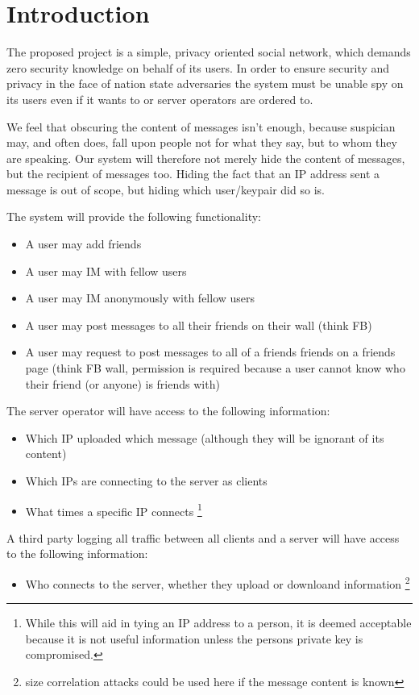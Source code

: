 \section{Introduction}
The proposed project is a simple, privacy oriented social network, which demands
zero security knowledge on behalf of its users. In order to ensure security and
privacy in the face of nation state adversaries the system must be unable spy on
its users even if it wants to or server operators are ordered to.

We feel that obscuring the content of messages isn't enough, because suspician
may, and often does, fall upon people not for what they say, but to whom they
are speaking. Our system will therefore not merely hide
the content of messages, but the recipient of messages too. Hiding the fact that
an IP address sent a message is out of scope, but hiding which user/keypair did
so is.

The system will provide the following functionality:
\begin{itemize}
\item A user may add friends
\item A user may IM with fellow users
\item A user may IM anonymously with fellow users
\item A user may post messages to all their friends on their wall (think FB)
\item A user may request to post messages to all of a friends friends on a
friends page (think FB wall, permission is required because a user cannot know
who their friend (or anyone) is friends with)
\end{itemize}

The server operator will have access to the following information:
\begin{itemize}
\item Which IP uploaded which message (although they will be ignorant of its
content)
\item Which IPs are connecting to the server as clients
\item What times a specific IP connects \footnote {While this will aid in tying
an IP address to a person, it is deemed acceptable because it is not useful
information unless the persons private key is compromised.}
\end{itemize}

A third party logging all traffic between all clients and a server will have
access to the following information: 
\begin{itemize}
\item Who connects to the server, whether they upload or downloand information
\footnote{size correlation attacks could be used here if the message content is
known}
\end{itemize}

